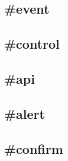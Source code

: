 \subsection{\#event}

\subsection{\#control}

\subsection{\#api}

\subsection{\#alert}

\subsection{\#confirm}


